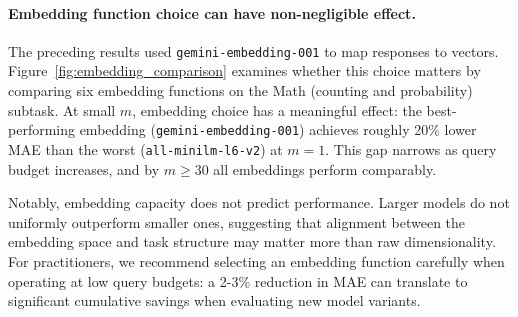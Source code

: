 \paragraph{Embedding function choice can have non-negligible effect.}
The preceding results used \texttt{gemini-embedding-001} to map responses to vectors. 
Figure~\ref{fig:embedding_comparison} examines whether this choice matters by comparing six embedding functions on the Math (counting and probability) subtask. 
At small $m$, embedding choice has a meaningful effect: the best-performing embedding (\texttt{gemini-embedding-001}) achieves roughly 20\% lower MAE than the worst (\texttt{all-minilm-l6-v2}) at $m=1$. 
This gap narrows as query budget increases, and by $m \geq 30$ all embeddings perform comparably. 

Notably, embedding capacity does not predict performance.
Larger models do not uniformly outperform smaller ones, suggesting that alignment between the embedding space and task structure may matter more than raw dimensionality. 
For practitioners, we recommend selecting an embedding function carefully when operating at low query budgets: a 2-3\% reduction in MAE can translate to significant cumulative savings when evaluating new model variants.

